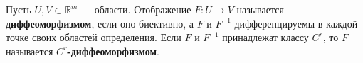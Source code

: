 \label{definition:04}

\begin{definition}
Пусть $U,V\subset\mathbb R^m$ --- области.
Отображение $F:U\to V$ называется \textbf{диффеоморфизмом}, если оно биективно, а $F$ и $F^{-1}$ дифференцируемы в каждой точке своих областей определения.
Если $F$ и $F^{-1}$ принадлежат классу $C^r$, то $F$ называется \textbf{$C^r$-диффеоморфизмом}.
\end{definition}
